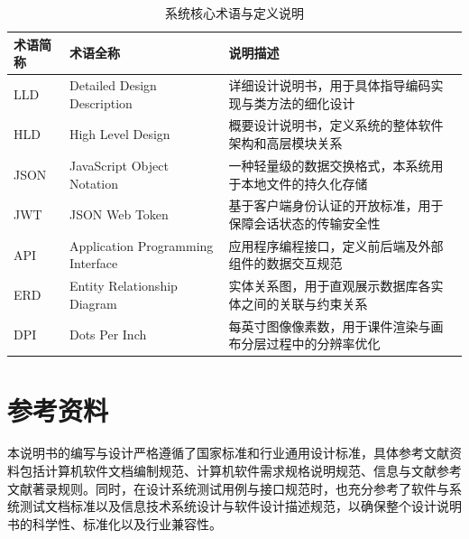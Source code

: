 \begin{table}[H]
\centering
\caption{系统核心术语与定义说明}
\label{tab:terms}
\begin{tabularx}{\textwidth}{llX}
\toprule
术语简称 & 术语全称 & 说明描述 \\
\midrule
LLD & Detailed Design Description & 详细设计说明书，用于具体指导编码实现与类方法的细化设计 \\
HLD & High Level Design & 概要设计说明书，定义系统的整体软件架构和高层模块关系 \\
JSON & JavaScript Object Notation & 一种轻量级的数据交换格式，本系统用于本地文件的持久化存储 \\
JWT & JSON Web Token & 基于客户端身份认证的开放标准，用于保障会话状态的传输安全性 \\
API & Application Programming Interface & 应用程序编程接口，定义前后端及外部组件的数据交互规范 \\
ERD & Entity Relationship Diagram & 实体关系图，用于直观展示数据库各实体之间的关联与约束关系 \\
DPI & Dots Per Inch & 每英寸图像像素数，用于课件渲染与画布分层过程中的分辨率优化 \\
\bottomrule
\end{tabularx}
\end{table}

\section{参考资料}
本说明书的编写与设计严格遵循了国家标准和行业通用设计标准，具体参考文献资料包括计算机软件文档编制规范\cite{gb8567}、计算机软件需求规格说明规范\cite{gb9385}、信息与文献参考文献著录规则\cite{gb7714}。同时，在设计系统测试用例与接口规范时，也充分参考了软件与系统测试文档标准\cite{ieee829}以及信息技术系统设计与软件设计描述规范\cite{ieee1016}，以确保整个设计说明书的科学性、标准化以及行业兼容性。
